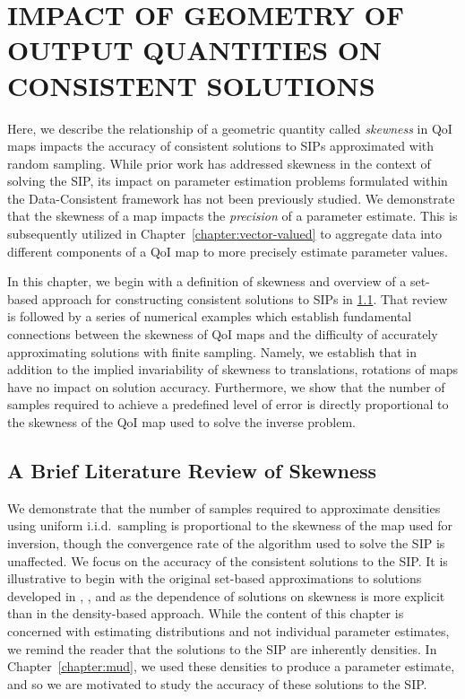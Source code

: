 \chapter{\uppercase{Impact of Geometry of Output Quantities on Consistent Solutions} \label{chapter:geometry}}

Here, we describe the relationship of a geometric quantity called \emph{skewness} in QoI maps impacts the accuracy of consistent solutions to SIPs approximated with random sampling.
While prior work has addressed skewness in the context of solving the SIP, its impact on parameter estimation problems formulated within the Data-Consistent framework has not been previously studied.
We demonstrate that the skewness of a map impacts the \emph{precision} of a parameter estimate.
This is subsequently utilized in Chapter~\ref{chapter:vector-valued} to aggregate data into different components of a QoI map to more precisely estimate parameter values.

In this chapter, we begin with a definition of skewness and overview of a set-based approach for constructing consistent solutions to SIPs in \ref{sec:skewness}.
That review is followed by a series of numerical examples which establish fundamental connections between the skewness of QoI maps and the difficulty of accurately approximating solutions with finite sampling.
Namely, we establish that in addition to the implied invariability of skewness to translations, rotations of maps have no impact on solution accuracy.
Furthermore, we show that the number of samples required to achieve a predefined level of error is directly proportional to the skewness of the QoI map used to solve the inverse problem.

\section{A Brief Literature Review of Skewness}\label{sec:skewness}


We demonstrate that the number of samples required to approximate densities using uniform i.i.d.~sampling is proportional to the skewness of the map used for inversion, though the convergence rate of the algorithm used to solve the SIP is unaffected.
We focus on the accuracy of the consistent solutions to the SIP.
It is illustrative to begin with the original set-based approximations to solutions developed in \cite{BBE11}, \cite{BES12}, and \cite{BET+14} as the dependence of solutions on skewness is more explicit than in the density-based approach.
While the content of this chapter is concerned with estimating distributions and not individual parameter estimates, we remind the reader that the solutions to the SIP are inherently densities.
In Chapter~\ref{chapter:mud}, we used these densities to produce a parameter estimate, and so we are motivated to study the accuracy of these solutions to the SIP.


